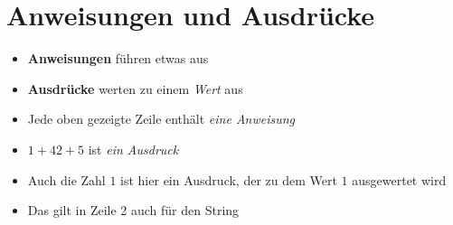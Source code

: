 




\subtitle{Kabitel 3: Daten Zwischenspeichern}
\maketitle


\section{Anweisungen und Ausdrücke}
\begin{frame}
	\slidehead
	\begin{itemize}
		\item \textbf{Anweisungen} führen etwas aus
		\item \textbf{Ausdrücke} werten zu einem \textit{Wert} aus
	\end{itemize}
	\pause
	\begin{itemize}
		\item Jede oben gezeigte Zeile enthält \textit{eine Anweisung}
		\item $1 + 42 + 5$ ist \textit{ein Ausdruck}
		\pause
		\item Auch die Zahl $1$ ist hier ein Ausdruck, der zu dem Wert $1$ ausgewertet wird
		\item Das gilt in Zeile 2 auch für den String
	\end{itemize}

\end{frame}




